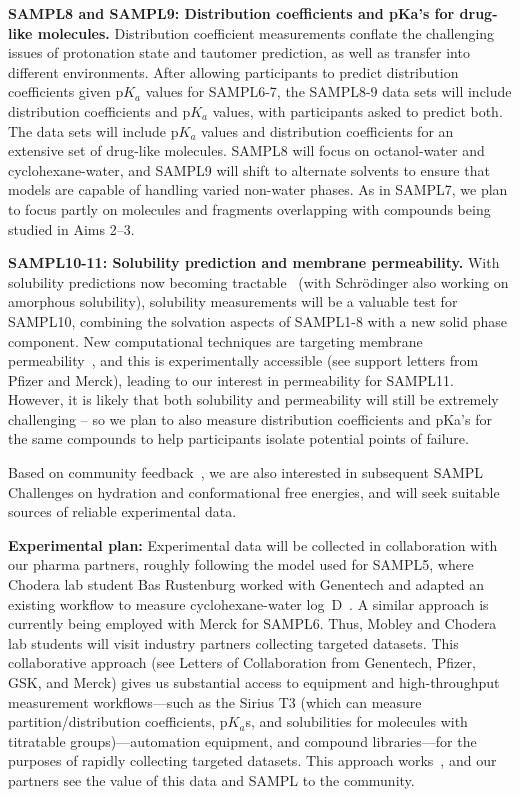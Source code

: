 \documentclass[11pt]{article}
\begin{document}
\textbf{SAMPL8 and SAMPL9: Distribution coefficients and pKa's for drug-like molecules.} 
Distribution coefficient measurements conflate the challenging issues of protonation state and tautomer prediction, as well as transfer into different environments. 
After allowing participants to predict distribution coefficients given p$K_a$ values for SAMPL6-7, the SAMPL8-9 data sets will include distribution coefficients and p$K_a$ values, with participants asked to predict both. 
The data sets will include p$K_a$ values and distribution coefficients for an extensive set of drug-like molecules.
SAMPL8 will focus on octanol-water and cyclohexane-water, and SAMPL9 will shift to alternate solvents to ensure that models are capable of handling varied non-water phases. 
As in SAMPL7, we plan to focus partly on molecules and fragments overlapping with compounds being studied in Aims 2--3.

\textbf{SAMPL10-11: Solubility prediction and membrane permeability.}
With solubility predictions now becoming tractable~\cite{Schnieders:2012:J.Chem.TheoryComput., park_absolute_2014, liu_using_2016} (with Schr\"{o}dinger also working on amorphous solubility), solubility measurements will be a valuable test for SAMPL10, combining the solvation aspects of SAMPL1-8 with a new solid phase component.
New computational techniques are targeting membrane permeability~\cite{lee_permeability_2016, comer_permeability_2014}, and this is experimentally accessible (see support letters from Pfizer and Merck), leading to our interest in permeability for SAMPL11.
However, it is likely that both solubility and permeability will still be extremely challenging -- so we plan to also measure distribution coefficients and pKa's for the same compounds to help participants isolate potential points of failure.

Based on community feedback~\cite{Mobley:2017:eScholarship}, we are also interested in subsequent SAMPL Challenges on hydration and conformational free energies, and will seek suitable sources of reliable experimental data.

{\bf Experimental plan:}
Experimental data will be collected in collaboration with our pharma partners, roughly following the model used for SAMPL5, where Chodera lab student Bas Rustenburg worked with Genentech and adapted an existing workflow to measure cyclohexane-water log~D~\cite{rustenburg_measuring_2016}.
A similar approach is currently being employed with Merck for SAMPL6.
Thus, Mobley and Chodera lab students will visit industry partners collecting targeted datasets.
This collaborative approach (see Letters of Collaboration from Genentech, Pfizer, GSK, and Merck) gives us substantial access to equipment and high-throughput measurement workflows---such as the Sirius T3 (which can measure partition/distribution coefficients, p$K_a$s, and solubilities for molecules with titratable groups)---automation equipment, and compound libraries---for the purposes of rapidly collecting targeted datasets.
This approach works~\cite{rustenburg_measuring_2016}, and our partners see the value of this data and SAMPL to the community.
\end{document}
